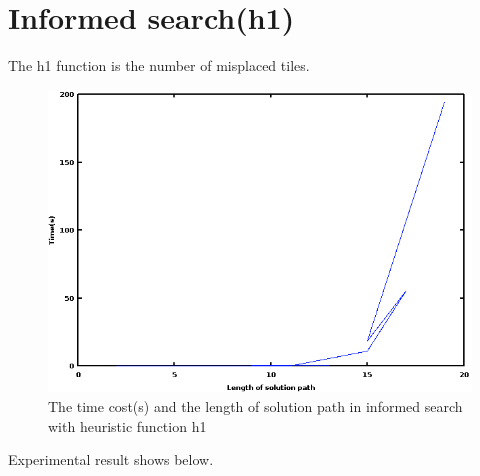 \documentclass{article}
\begin{document}
\section{Informed search(h1)}
The h1 function is the number of misplaced tiles. 
\begin{figure}[H]
\includegraphics[width=1.0\textwidth]{h1.png}
\caption{The time cost(s) and the length of solution path in informed search with heuristic function h1}
\end{figure}
Experimental result shows below. 
\end{document}
